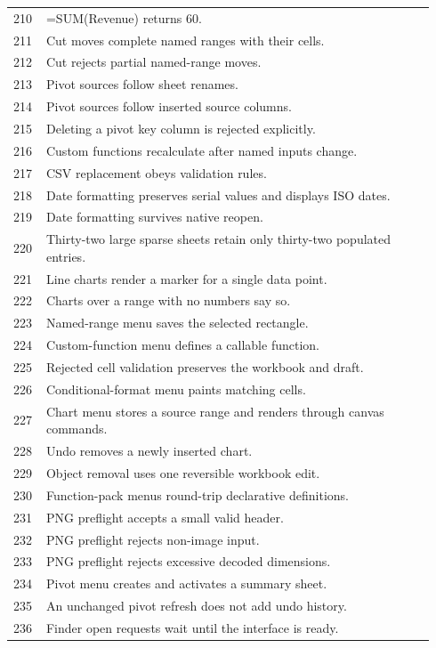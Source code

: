 \documentclass[11pt,letterpaper]{article}
\begin{document}
\begin{longtable}{@{}P{0.07\linewidth}P{0.87\linewidth}@{}}
210 & =SUM(Revenue) returns 60.\\
211 & Cut moves complete named ranges with their cells.\\
212 & Cut rejects partial named-range moves.\\
213 & Pivot sources follow sheet renames.\\
214 & Pivot sources follow inserted source columns.\\
215 & Deleting a pivot key column is rejected explicitly.\\
216 & Custom functions recalculate after named inputs change.\\
217 & CSV replacement obeys validation rules.\\
218 & Date formatting preserves serial values and displays ISO dates.\\
219 & Date formatting survives native reopen.\\
220 & Thirty-two large sparse sheets retain only thirty-two populated entries.\\
221 & Line charts render a marker for a single data point.\\
222 & Charts over a range with no numbers say so.\\
223 & Named-range menu saves the selected rectangle.\\
224 & Custom-function menu defines a callable function.\\
225 & Rejected cell validation preserves the workbook and draft.\\
226 & Conditional-format menu paints matching cells.\\
227 & Chart menu stores a source range and renders through canvas commands.\\
228 & Undo removes a newly inserted chart.\\
229 & Object removal uses one reversible workbook edit.\\
230 & Function-pack menus round-trip declarative definitions.\\
231 & PNG preflight accepts a small valid header.\\
232 & PNG preflight rejects non-image input.\\
233 & PNG preflight rejects excessive decoded dimensions.\\
234 & Pivot menu creates and activates a summary sheet.\\
235 & An unchanged pivot refresh does not add undo history.\\
236 & Finder open requests wait until the interface is ready.\\

\end{longtable}
\end{document}
